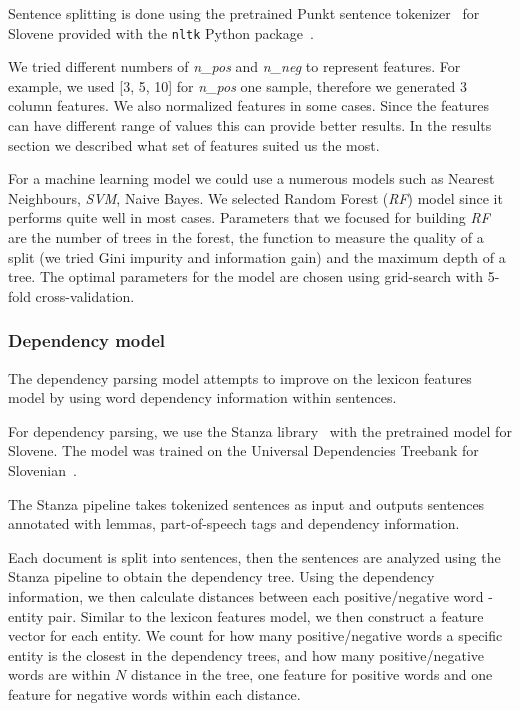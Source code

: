 \documentclass[11pt,a4paper]{article}
\begin{document}
Sentence splitting is done using the pretrained Punkt sentence tokenizer~\cite{kiss2006unsupervised} for Slovene provided with the \texttt{nltk} Python package~\cite{bird2009natural}.

We tried different numbers of \emph{n\_pos} and \emph{n\_neg} to represent features. 
For example, we used [3, 5, 10] for \emph{n\_pos} one sample, therefore we generated 3 column features.
We also normalized features in some cases. 
Since the features can have different range of values this can provide better results.
In the results section we described what set of features suited us the most.

For a machine learning model we could use a numerous models such as Nearest Neighbours, \emph{SVM}, Naive Bayes.
We selected Random Forest (\emph{RF}) model since it performs quite well in most cases.
Parameters that we focused for building \emph{RF} are the number of trees in the forest, the function to measure the quality of a split (we tried Gini impurity and information gain) and the maximum depth of a tree. 
The optimal parameters for the model are chosen using grid-search with 5-fold cross-validation.


\subsubsection{Dependency model}

The dependency parsing model attempts to improve on the lexicon features model by using word dependency information within sentences.

For dependency parsing, we use the Stanza library~\cite{qi2020stanza} with the pretrained model for Slovene. The model was trained on the Universal Dependencies Treebank for Slovenian~\cite{dobrovoljc2017universal}.

The Stanza pipeline takes tokenized sentences as input and outputs sentences annotated with lemmas, part-of-speech tags and dependency information.

Each document is split into sentences, then the sentences are analyzed using the Stanza pipeline to obtain the dependency tree.
Using the dependency information, we then calculate distances between each positive/negative word - entity pair.
Similar to the lexicon features model, we then construct a feature vector for each entity. We count for how many positive/negative words a specific entity is the closest in the dependency trees, and how many positive/negative words are within $N$ distance in the tree, one feature for positive words and one feature for negative words within each distance.
\end{document}
